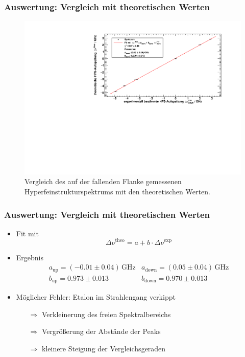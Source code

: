 \begin{frame}
\frametitle{Auswertung: Vergleich mit theoretischen Werten}
\begin{figure}
\begin{center}
    \includegraphics[width=\textwidth]{../img/down-spectrum.pdf}
    \caption{Vergleich des auf der fallenden Flanke gemessenen Hyperfeinstrukturspektrums mit den theoretischen Werten.}
\end{center}
\end{figure}
\end{frame}


\begin{frame}
\frametitle{Auswertung: Vergleich mit theoretischen Werten}
\begin{itemize}[<+->]
    \item Fit mit
    \begin{equation*}
        \Delta \nu^\text{theo} = a + b \cdot \Delta \nu^\text{exp}
    \end{equation*}
    \item Ergebnis
    \begin{equation*}
        \begin{array}{ll}
            a_\text{up} = (-0.01 \pm 0.04)\,\text{GHz} & a_\text{down} = (0.05 \pm 0.04)\,\text{GHz} \\
            b_\text{up} = 0.973 \pm 0.013 & b_\text{down} = 0.970 \pm 0.013
        \end{array}
    \end{equation*}
    \item Möglicher Fehler: Etalon im Strahlengang verkippt
    \begin{itemize}[<+->]
        \item[$\Rightarrow$] Verkleinerung des freien Spektralbereichs
        \item[$\Rightarrow$] Vergrößerung der Abstände der Peaks
        \item[$\Rightarrow$] kleinere Steigung der Vergleichsgeraden
    \end{itemize}
\end{itemize}
\end{frame}

